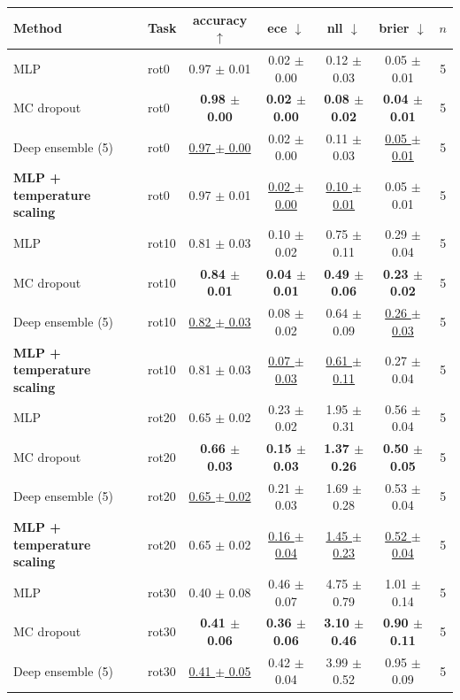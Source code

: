 \begin{tabular}{llccccc}
\toprule
Method & Task & accuracy $\uparrow$ & ece $\downarrow$ & nll $\downarrow$ & brier $\downarrow$ & $n$ \\
\midrule
MLP & rot0 & 0.97 $\pm$ 0.01 & 0.02 $\pm$ 0.00 & 0.12 $\pm$ 0.03 & 0.05 $\pm$ 0.01 & 5 \\
MC dropout & rot0 & \textbf{0.98 $\pm$ 0.00} & \textbf{0.02 $\pm$ 0.00} & \textbf{0.08 $\pm$ 0.02} & \textbf{0.04 $\pm$ 0.01} & 5 \\
Deep ensemble (5) & rot0 & \underline{0.97 $\pm$ 0.00} & 0.02 $\pm$ 0.00 & 0.11 $\pm$ 0.03 & \underline{0.05 $\pm$ 0.01} & 5 \\
\textbf{MLP + temperature scaling} & rot0 & 0.97 $\pm$ 0.01 & \underline{0.02 $\pm$ 0.00} & \underline{0.10 $\pm$ 0.01} & 0.05 $\pm$ 0.01 & 5 \\
\midrule
MLP & rot10 & 0.81 $\pm$ 0.03 & 0.10 $\pm$ 0.02 & 0.75 $\pm$ 0.11 & 0.29 $\pm$ 0.04 & 5 \\
MC dropout & rot10 & \textbf{0.84 $\pm$ 0.01} & \textbf{0.04 $\pm$ 0.01} & \textbf{0.49 $\pm$ 0.06} & \textbf{0.23 $\pm$ 0.02} & 5 \\
Deep ensemble (5) & rot10 & \underline{0.82 $\pm$ 0.03} & 0.08 $\pm$ 0.02 & 0.64 $\pm$ 0.09 & \underline{0.26 $\pm$ 0.03} & 5 \\
\textbf{MLP + temperature scaling} & rot10 & 0.81 $\pm$ 0.03 & \underline{0.07 $\pm$ 0.03} & \underline{0.61 $\pm$ 0.11} & 0.27 $\pm$ 0.04 & 5 \\
\midrule
MLP & rot20 & 0.65 $\pm$ 0.02 & 0.23 $\pm$ 0.02 & 1.95 $\pm$ 0.31 & 0.56 $\pm$ 0.04 & 5 \\
MC dropout & rot20 & \textbf{0.66 $\pm$ 0.03} & \textbf{0.15 $\pm$ 0.03} & \textbf{1.37 $\pm$ 0.26} & \textbf{0.50 $\pm$ 0.05} & 5 \\
Deep ensemble (5) & rot20 & \underline{0.65 $\pm$ 0.02} & 0.21 $\pm$ 0.03 & 1.69 $\pm$ 0.28 & 0.53 $\pm$ 0.04 & 5 \\
\textbf{MLP + temperature scaling} & rot20 & 0.65 $\pm$ 0.02 & \underline{0.16 $\pm$ 0.04} & \underline{1.45 $\pm$ 0.23} & \underline{0.52 $\pm$ 0.04} & 5 \\
\midrule
MLP & rot30 & 0.40 $\pm$ 0.08 & 0.46 $\pm$ 0.07 & 4.75 $\pm$ 0.79 & 1.01 $\pm$ 0.14 & 5 \\
MC dropout & rot30 & \textbf{0.41 $\pm$ 0.06} & \textbf{0.36 $\pm$ 0.06} & \textbf{3.10 $\pm$ 0.46} & \textbf{0.90 $\pm$ 0.11} & 5 \\
Deep ensemble (5) & rot30 & \underline{0.41 $\pm$ 0.05} & 0.42 $\pm$ 0.04 & 3.99 $\pm$ 0.52 & 0.95 $\pm$ 0.09 & 5 \\

\end{tabular}
